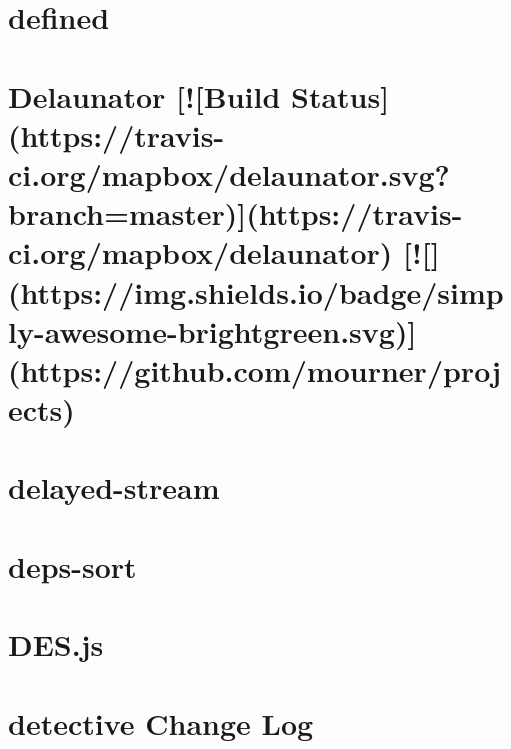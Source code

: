 \documentclass[twoside]{book}
\newcommand{\+}{\discretionary{\mbox{\scriptsize$\hookleftarrow$}}{}{}}
\begin{document}
\chapter{defined}
\label{md_dsmacc_examples_DRmerge_node_modules_defined_readme}

\chapter{Delaunator \mbox{[}!\mbox{[}Build Status\mbox{]}(https\+://travis-\/ci.org/mapbox/delaunator.svg?branch=master)\mbox{]}(https\+://travis-\/ci.org/mapbox/delaunator) \mbox{[}!\mbox{[}\mbox{]}(https\+://img.shields.\+io/badge/simply-\/awesome-\/brightgreen.svg)\mbox{]}(https\+://github.com/mourner/projects)}
\label{md_dsmacc_examples_DRmerge_node_modules_delaunator_README}

\chapter{delayed-\/stream}
\label{md_dsmacc_examples_DRmerge_node_modules_delayed-stream_Readme}

\chapter{deps-\/sort}
\label{md_dsmacc_examples_DRmerge_node_modules_deps-sort_readme}

\chapter{D\+E\+S.\+js}
\label{md_dsmacc_examples_DRmerge_node_modules_des_8js_README}

\chapter{detective Change Log}
\label{md_dsmacc_examples_DRmerge_node_modules_detective_CHANGELOG}

\end{document}
